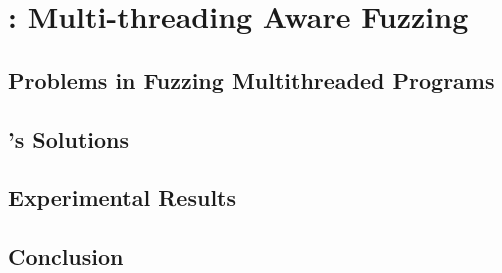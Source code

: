 
\chapter{\mtfuzz: Multi-threading Aware Fuzzing} \label{Chapter8}

\section{Problems in Fuzzing Multithreaded Programs}


\section{\mtfuzz's Solutions}

\section{Experimental Results}

\section{Conclusion}
